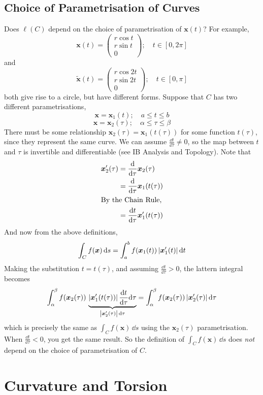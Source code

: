 \documentclass{article}
\begin{document}
\subsection{Choice of Parametrisation of Curves}
Does $\ell(C)$ depend on the choice of parametrisation of $\bm x(t)$? For example,
\[ \bm x(t) = \begin{pmatrix}
        r\cos t \\ r \sin t \\ 0
    \end{pmatrix};\quad t \in [0, 2\pi] \]
and
\[ \widetilde{\bm x}(t) = \begin{pmatrix}
        r\cos 2t \\ r \sin 2t \\ 0
    \end{pmatrix};\quad t \in [0, \pi] \]
both give rise to a circle, but have different forms. Suppose that $C$ has two different parametrisations,
\[ \bm x = \bm x_1(t);\quad a \leq t \leq b \]
\[ \bm x = \bm x_2(\tau);\quad \alpha \leq \tau \leq \beta \]
There must be some relationship $\bm x_2(\tau) = \bm x_1(t(\tau))$ for some function $t(\tau)$, since they represent the same curve. We can assume $\frac{\dd t}{\dd \tau} \neq 0$, so the map between $t$ and $\tau$ is invertible and differentiable (see IB Analysis and Topology). Note that
\begin{align*}
    \bm x_2'(\tau) & = \frac{\dd}{\dd \tau}\bm x_2(\tau)       \\
                   & = \frac{\dd}{\dd \tau}\bm x_1(t(\tau))    \\
    \intertext{By the Chain Rule,}
                   & = \frac{\dd t}{\dd \tau}\bm x_1'(t(\tau))
\end{align*}
And now from the above definitions,
\[ \int_C f(\bm x) \,\dd s = \int_a^b f(\bm x_1(t)) \, \abs{\bm x_1'(t)} \,\dd t \]
Making the substitution $t = t(\tau)$, and assuming $\frac{\dd t}{\dd \tau} > 0$, the lattern integral becomes
\[ \int_\alpha^\beta f(\bm x_2(\tau)) \, \underbrace{\abs{\bm x_1'(t(\tau))} \,\frac{\dd t}{\dd \tau}\dd \tau}_{\abs{\bm x_2'(\tau)}\,\dd \tau} = \int_\alpha^\beta f(\bm x_2(\tau)) \, \abs{\bm x_2'(\tau)} \,\dd \tau \]
which is precisely the same as $\int_C f(\bm x) \,\dd s$ using the $\bm x_2(\tau)$ parametrisation. When $\frac{\dd t}{\dd \tau} < 0$, you get the same result. So the definition of $\int_C f(\bm x) \, \dd s$ does \textit{not} depend on the choice of parametrisation of $C$.

\section{Curvature and Torsion}
\end{document}

